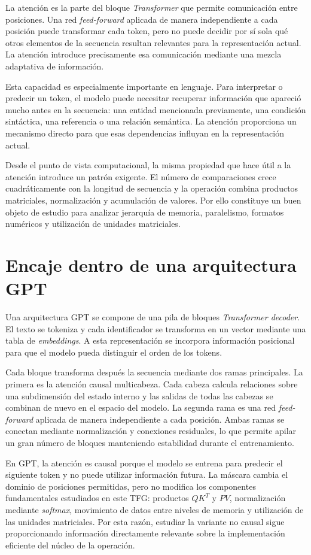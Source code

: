 La atención es la parte del bloque \textit{Transformer} que permite comunicación entre posiciones. Una red \textit{feed-forward} aplicada de manera independiente a cada posición puede transformar cada token, pero no puede decidir por sí sola qué otros elementos de la secuencia resultan relevantes para la representación actual. La atención introduce precisamente esa comunicación mediante una mezcla adaptativa de información.

Esta capacidad es especialmente importante en lenguaje. Para interpretar o predecir un token, el modelo puede necesitar recuperar información que apareció mucho antes en la secuencia: una entidad mencionada previamente, una condición sintáctica, una referencia o una relación semántica. La atención proporciona un mecanismo directo para que esas dependencias influyan en la representación actual.

Desde el punto de vista computacional, la misma propiedad que hace útil a la atención introduce un patrón exigente. El número de comparaciones crece cuadráticamente con la longitud de secuencia y la operación combina productos matriciales, normalización y acumulación de valores. Por ello constituye un buen objeto de estudio para analizar jerarquía de memoria, paralelismo, formatos numéricos y utilización de unidades matriciales.

\section{Encaje dentro de una arquitectura GPT}

Una arquitectura GPT se compone de una pila de bloques \textit{Transformer decoder}. El texto se tokeniza y cada identificador se transforma en un vector mediante una tabla de \textit{embeddings}. A esta representación se incorpora información posicional para que el modelo pueda distinguir el orden de los tokens.

Cada bloque transforma después la secuencia mediante dos ramas principales. La primera es la atención causal multicabeza. Cada cabeza calcula relaciones sobre una subdimensión del estado interno y las salidas de todas las cabezas se combinan de nuevo en el espacio del modelo. La segunda rama es una red \textit{feed-forward} aplicada de manera independiente a cada posición. Ambas ramas se conectan mediante normalización y conexiones residuales, lo que permite apilar un gran número de bloques manteniendo estabilidad durante el entrenamiento.

En GPT, la atención es causal porque el modelo se entrena para predecir el siguiente token y no puede utilizar información futura. La máscara cambia el dominio de posiciones permitidas, pero no modifica los componentes fundamentales estudiados en este TFG: productos \(QK^T\) y \(PV\), normalización mediante \textit{softmax}, movimiento de datos entre niveles de memoria y utilización de las unidades matriciales. Por esta razón, estudiar la variante no causal sigue proporcionando información directamente relevante sobre la implementación eficiente del núcleo de la operación.
